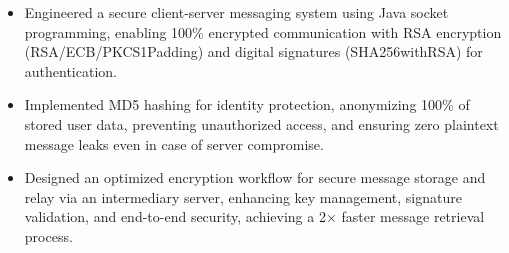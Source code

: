 \vspace{0.5cm}
\begin{samepage}
{
  {\begin{itemize}
    \item Engineered a secure client-server messaging system using Java socket programming, enabling 100\% encrypted communication with RSA encryption (RSA/ECB/PKCS1Padding) and digital signatures (SHA256withRSA) for authentication.
    \item Implemented MD5 hashing for identity protection, anonymizing 100\% of stored user data, preventing unauthorized access, and ensuring zero plaintext message leaks even in case of server compromise.
    \item Designed an optimized encryption workflow for secure message storage and relay via an intermediary server, enhancing key management, signature validation, and end-to-end security, achieving a 2× faster message retrieval process.
  \end{itemize}
  }
}
\end{samepage}
